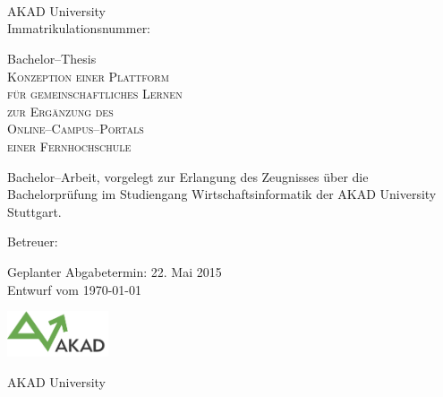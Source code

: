 

\begin{titlepage}


\vspace{5cm}

\Name \\ 
\Strasse \\ 
\PlzOrt\\ 
\href{mailto:\Email}{\Email}

AKAD University\\
Immatrikulationsnummer: \Immatrikulationsnummer

\vfill

Bachelor--Thesis\\
\LARGE
\textsc{Konzeption einer Plattform\\
für gemeinschaftliches Lernen\\
zur Ergänzung des \\
Online--Campus--Portals\\
einer Fernhochschule}

\vfill

\normalsize

Bachelor--Arbeit, vorgelegt zur Erlangung des Zeugnisses über die Bachelorprüfung im Studiengang Wirtschaftsinformatik der AKAD University Stuttgart.

Betreuer: \Betreuer

Geplanter Abgabetermin: 22. Mai 2015\\
Entwurf vom \today %


\vfill

\includegraphics[width=3cm]{akad_logo.png}  

AKAD University 

\end{titlepage}



\normalsize
